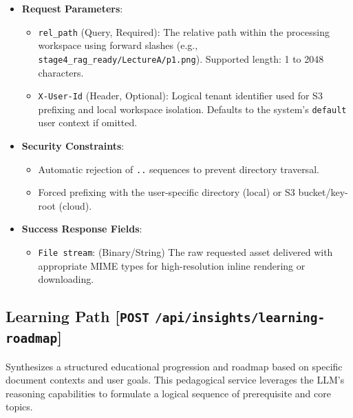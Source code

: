 \begin{itemize}
    \item \textbf{Request Parameters}:
    \begin{itemize}
        \item \texttt{rel\_path} (Query, Required): The relative path within the processing workspace using forward slashes (e.g., \texttt{stage4\_rag\_ready/LectureA/p1.png}). Supported length: 1 to 2048 characters.
        \item \texttt{X-User-Id} (Header, Optional): Logical tenant identifier used for S3 prefixing and local workspace isolation. Defaults to the system's \texttt{default} user context if omitted.
    \end{itemize}
    \item \textbf{Security Constraints}: 
    \begin{itemize}
        \item Automatic rejection of \texttt{..} sequences to prevent directory traversal.
        \item Forced prefixing with the user-specific directory (local) or S3 bucket/key-root (cloud).
    \end{itemize}
    \item \textbf{Success Response Fields}:
    \begin{itemize}
        \item \texttt{File stream}: (Binary/String) The raw requested asset delivered with appropriate MIME types for high-resolution inline rendering or downloading.
    \end{itemize}
\end{itemize}

\subsection{Learning Path [\texttt{POST} \texttt{/api/insights/learning-roadmap}]}
Synthesizes a structured educational progression and roadmap based on specific document contexts and user goals. This pedagogical service leverages the LLM's reasoning capabilities to formulate a logical sequence of prerequisite and core topics.

